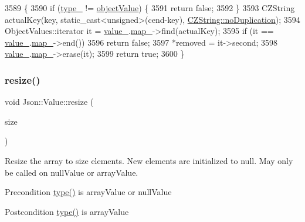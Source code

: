 \begin{DoxyCode}
3589 \{
3590   \textcolor{keywordflow}{if} (\hyperlink{class_json_1_1_value_abd222c2536dc88bf330dedcd076d2356}{type\_} != \hyperlink{namespace_json_a7d654b75c16a57007925868e38212b4eae8386dcfc36d1ae897745f7b4f77a1f6}{objectValue}) \{
3591     \textcolor{keywordflow}{return} \textcolor{keyword}{false};
3592   \}
3593   CZString actualKey(key, static\_cast<unsigned>(cend-key), 
      \hyperlink{class_json_1_1_value_1_1_c_z_string_a2805c46fb4a72bbaed55de6d75941b6da08d540450fa6c4af57eaacf063eedd20}{CZString::noDuplication});
3594   ObjectValues::iterator it = \hyperlink{class_json_1_1_value_aef578244546212705b9f81eb84d7e151}{value\_}.\hyperlink{union_json_1_1_value_1_1_value_holder_a1e7a5b86d4f52234f55c847ad1ce389a}{map\_}->find(actualKey);
3595   \textcolor{keywordflow}{if} (it == \hyperlink{class_json_1_1_value_aef578244546212705b9f81eb84d7e151}{value\_}.\hyperlink{union_json_1_1_value_1_1_value_holder_a1e7a5b86d4f52234f55c847ad1ce389a}{map\_}->end())
3596     \textcolor{keywordflow}{return} \textcolor{keyword}{false};
3597   *removed = it->second;
3598   \hyperlink{class_json_1_1_value_aef578244546212705b9f81eb84d7e151}{value\_}.\hyperlink{union_json_1_1_value_1_1_value_holder_a1e7a5b86d4f52234f55c847ad1ce389a}{map\_}->erase(it);
3599   \textcolor{keywordflow}{return} \textcolor{keyword}{true};
3600 \}
\end{DoxyCode}
\mbox{\label{class_json_1_1_value_aa284353271ada427dbfa04a42f2be407}} 
\subsubsection{\texorpdfstring{resize()}{resize()}}
{\footnotesize\ttfamily void Json\+::\+Value\+::resize (\begin{DoxyParamCaption}\item[{\hyperlink{class_json_1_1_value_a184a91566cccca7b819240f0d5561c7d}{Array\+Index}}]{size }\end{DoxyParamCaption})}

Resize the array to size elements. New elements are initialized to null. May only be called on null\+Value or array\+Value. \begin{DoxyPrecond}{Precondition}
\hyperlink{class_json_1_1_value_a8ce61157a011894f0252ceed232312de}{type()} is array\+Value or null\+Value 
\end{DoxyPrecond}
\begin{DoxyPostcond}{Postcondition}
\hyperlink{class_json_1_1_value_a8ce61157a011894f0252ceed232312de}{type()} is array\+Value 
\end{DoxyPostcond}


